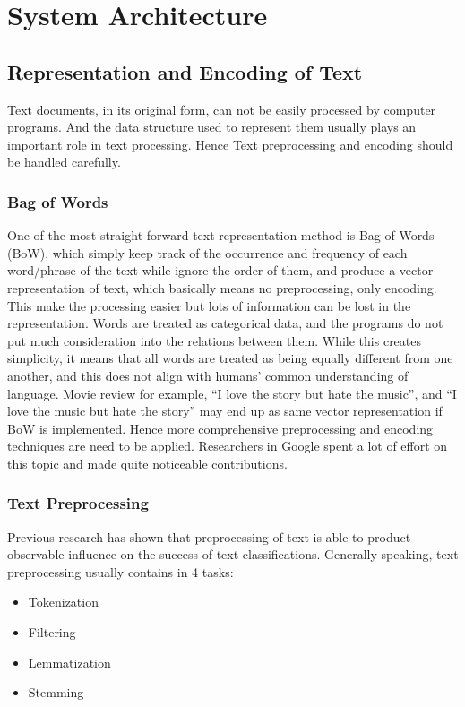 \documentclass[conference]{IEEEtran}
\begin{document}
\section{System Architecture}
\label{model}
\subsection{Representation and Encoding of Text}
    Text documents, in its original form, can not be easily processed
    by computer programs. And the data structure used to represent them usually plays 
    an important role in text processing\cite{hotho2005brief,allahyari2017brief}. Hence
    Text preprocessing and encoding should be handled carefully.
    
\subsubsection{Bag of Words}
    One of the most straight forward text representation method is Bag-of-Words (BoW), 
    which simply keep track of the occurrence and frequency of each word/phrase of the text 
    while ignore the order of them, and produce a vector representation of text, which 
    basically means no preprocessing, only encoding. 
    This make the processing easier but lots of information can be lost in the 
    representation. 
    Words are treated as categorical data, and the programs do not put much consideration
    into the relations between them. While this creates simplicity, it means that all 
    words are treated as being equally different from one another, and this does not 
    align with humans' common understanding of language. 
    Movie review for example, ``I love the story but hate the music'', 
    and ``I love the music but hate the story'' may end up as same vector representation
    if BoW is implemented. Hence more comprehensive preprocessing and encoding techniques
    are need to be applied.
    Researchers in Google spent a lot of effort on this topic and 
    made quite noticeable contributions\cite{mikolov2013efficient, word2vec}.
    
\subsubsection{Text Preprocessing}
    Previous research has shown that preprocessing of text is able to product observable
    influence on the success of text classifications\cite{uysal2014impact}.
    Generally speaking, text preprocessing usually contains in 4 
    tasks\cite{allahyari2017brief}:
    \begin{itemize}
        \item Tokenization
        \item Filtering
        \item Lemmatization
        \item Stemming
    \end{itemize}
    
\end{document}
